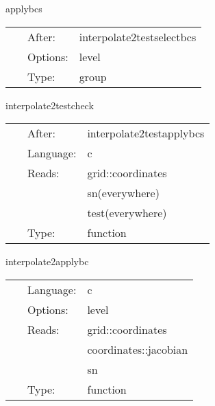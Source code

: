 \vspace{5mm}


\hspace{5mm} applybcs 

\hspace{5mm}{\it test: interpolate test grid function } 


\hspace{5mm}

 \begin{tabular*}{160mm}{cll} 
~ & After:  & interpolate2testselectbcs \\ 
~ & Options:  & level \\ 
~ & Type:  & group \\ 
\end{tabular*} 


\vspace{5mm}


\hspace{5mm} interpolate2testcheck 

\hspace{5mm}{\it test: check test grid function } 


\hspace{5mm}

 \begin{tabular*}{160mm}{cll} 
~ & After:  & interpolate2testapplybcs \\ 
~ & Language:  & c \\ 
~ & Reads:  & grid::coordinates \\ 
~& ~ &sn(everywhere)\\ 
~& ~ &test(everywhere)\\ 
~ & Type:  & function \\ 
\end{tabular*} 


\vspace{5mm}


\hspace{5mm} interpolate2applybc 

\hspace{5mm}{\it apply interpolating inter-patch boundaries } 


\hspace{5mm}

 \begin{tabular*}{160mm}{cll} 
~ & Language:  & c \\ 
~ & Options:  & level \\ 
~ & Reads:  & grid::coordinates \\ 
~& ~ &coordinates::jacobian\\ 
~& ~ &sn\\ 
~ & Type:  & function \\ 
\end{tabular*} 



